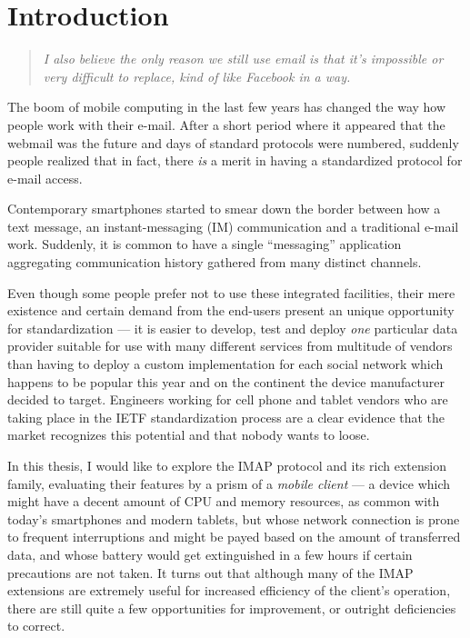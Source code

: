 \documentclass[trojita]{subfiles}
\begin{document}
\chapter{Introduction}

\begin{quote}
  \itshape I also believe the only reason we still use email is that it’s impossible or very difficult to replace, kind
  of like Facebook in a way. 
\end{quote}

The boom of mobile computing in the last few years has changed the way how people work with their e-mail.  After a short
period where it appeared that the webmail was the future and days of standard protocols were numbered, suddenly people
realized that in fact, there {\em is} a merit in having a standardized protocol for e-mail access.

Contemporary smartphones started to smear down the border between how a text message, an instant-messaging (IM)
communication and a traditional e-mail work.  Suddenly, it is common to have a single ``messaging'' application
aggregating communication history gathered from many distinct channels.

Even though some people prefer not to use these integrated facilities, their mere existence and certain demand from the
end-users present an unique opportunity for standardization --- it is easier to develop, test and deploy {\em one}
particular data provider suitable for use with many different services from multitude of vendors than having to deploy a
custom implementation for each social network which happens to be popular this year and on the continent the device
manufacturer decided to target.  Engineers working for cell phone and tablet vendors who are taking place in the IETF
standardization process are a clear evidence that the market recognizes this potential and that nobody wants to loose.

In this thesis, I would like to explore the IMAP protocol \cite{rfc3501} and its rich extension family, evaluating their
features by a prism of a {\em mobile client} --- a device which might have a decent amount of CPU and memory resources,
as common with today's smartphones and modern tablets, but whose network connection is prone to frequent interruptions
and might be payed based on the amount of transferred data, and whose battery would get extinguished in a few hours if
certain precautions are not taken.  It turns out that although many of the IMAP extensions are extremely useful for
increased efficiency of the client's operation, there are still quite a few opportunities for improvement, or outright
deficiencies to correct.
\end{document}
